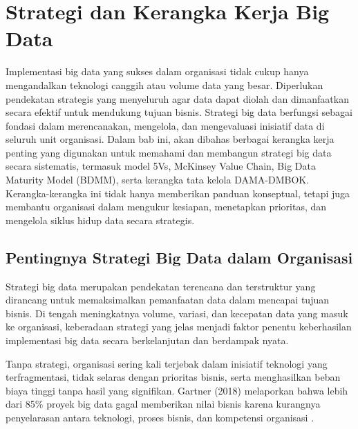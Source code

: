 \chapter{Strategi dan Kerangka Kerja Big Data}

\noindent
Implementasi big data yang sukses dalam organisasi tidak cukup hanya mengandalkan teknologi canggih atau volume data yang besar. Diperlukan pendekatan strategis yang menyeluruh agar data dapat diolah dan dimanfaatkan secara efektif untuk mendukung tujuan bisnis. Strategi big data berfungsi sebagai fondasi dalam merencanakan, mengelola, dan mengevaluasi inisiatif data di seluruh unit organisasi. Dalam bab ini, akan dibahas berbagai kerangka kerja penting yang digunakan untuk memahami dan membangun strategi big data secara sistematis, termasuk model 5Vs, McKinsey Value Chain, Big Data Maturity Model (BDMM), serta kerangka tata kelola DAMA-DMBOK. Kerangka-kerangka ini tidak hanya memberikan panduan konseptual, tetapi juga membantu organisasi dalam mengukur kesiapan, menetapkan prioritas, dan mengelola siklus hidup data secara strategis.


\section{Pentingnya Strategi Big Data dalam Organisasi}

Strategi big data merupakan pendekatan terencana dan terstruktur yang dirancang untuk memaksimalkan pemanfaatan data dalam mencapai tujuan bisnis. Di tengah meningkatnya volume, variasi, dan kecepatan data yang masuk ke organisasi, keberadaan strategi yang jelas menjadi faktor penentu keberhasilan implementasi big data secara berkelanjutan dan berdampak nyata.

Tanpa strategi, organisasi sering kali terjebak dalam inisiatif teknologi yang terfragmentasi, tidak selaras dengan prioritas bisnis, serta menghasilkan beban biaya tinggi tanpa hasil yang signifikan. Gartner (2018) melaporkan bahwa lebih dari 85\% proyek big data gagal memberikan nilai bisnis karena kurangnya penyelarasan antara teknologi, proses bisnis, dan kompetensi organisasi \cite{gartner2018}.

